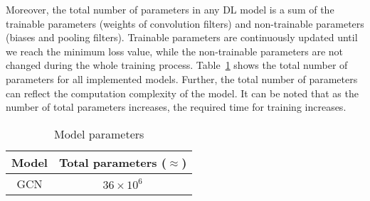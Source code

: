 \documentclass[runningheads]{llncs}
\begin{document}

Moreover, the total number of parameters in any DL model is a sum of the trainable parameters (weights of convolution filters) and non-trainable parameters (biases and pooling filters).
Trainable parameters are continuously updated until we reach the minimum loss value, while the non-trainable parameters are not changed during the whole training process.
Table~\ref{tab:table_parameters} shows the total number of parameters for all implemented models.
Further, the total number of parameters can reflect the computation complexity of the model.
It can be noted that as the number of total parameters increases, the required time for training increases.
\begin{table}[]
	\centering
	\caption{Model parameters}
	\label{tab:table_parameters}
	\begin{tabular}{cc}\hline
		Model &  Total parameters (\(\approx\)) \\ \hline
		GCN & \(36\times 10^6\) \\ \hline
	\end{tabular}
\end{table}
\end{document}
